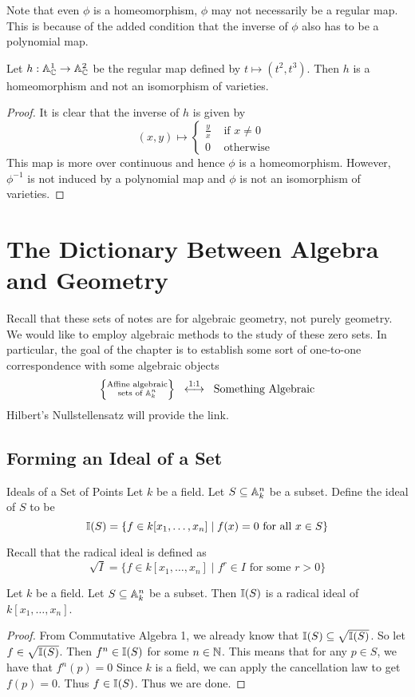 \documentclass[a4paper]{article}
\begin{document}
Note that even $\phi$ is a homeomorphism, $\phi$ may not necessarily be a regular map. This is because of the added condition that the inverse of $\phi$ also has to be a polynomial map. 

\begin{eg}{}{} Let $h:\mathbb{A}_{\mathbb{C}}^1\to\mathbb{A}_{\mathbb{C}}^2$ be the regular map defined by $t\mapsto(t^2,t^3)$. Then $h$ is a homeomorphism and not an isomorphism of varieties. \tcbline
\begin{proof}
It is clear that the inverse of $h$ is given by $$(x,y)\mapsto\begin{cases}
\frac{y}{x} & \text{ if }x\neq 0\\
0 & \text{ otherwise }
\end{cases}$$ This map is more over continuous and hence $\phi$ is a homeomorphism. However, $\phi^{-1}$ is not induced by a polynomial map and $\phi$ is not an isomorphism of varieties. 
\end{proof}
\end{eg}

\pagebreak
\section{The Dictionary Between Algebra and Geometry}
Recall that these sets of notes are for algebraic geometry, not purely geometry. We would like to employ algebraic methods to the study of these zero sets. In particular, the goal of the chapter is to establish some sort of one-to-one correspondence with some algebraic objects $$\left\{\substack{\text{Affine algebraic}\\\text{sets of }\mathbb{A}_k^n}\right\}\;\;\overset{1:1}{\longleftrightarrow}\;\;\text{Something Algebraic}$$ Hilbert's Nullstellensatz will provide the link. 

\subsection{Forming an Ideal of a Set}
\begin{defn}{Ideals of a Set of Points}{} Let $k$ be a field. Let $S\subseteq\mathbb{A}_k^n$ be a subset. Define the ideal of $S$ to be $$\mathbb{I}(S)=\{f\in k[x_1,\dots,x_n]\;|\;f(x)=0\text{ for all }x\in S\}$$ 
\end{defn}

Recall that the radical ideal is defined as $$\sqrt{I}=\{f\in k[x_1,\dots,x_n]\;|\;f^r\in I\text{ for some }r>0\}$$

\begin{lmm}{}{} Let $k$ be a field. Let $S\subseteq\mathbb{A}_k^n$ be a subset. Then $\mathbb{I}(S)$ is a radical ideal of $k[x_1,\dots,x_n]$. \tcbline
\begin{proof}
From Commutative Algebra 1, we already know that $\mathbb{I}(S)\subseteq\sqrt{\mathbb{I}(S)}$. So let $f\in\sqrt{\mathbb{I}(S)}$. Then $f^n\in\mathbb{I}(S)$ for some $n\in\mathbb{N}$. This means that for any $p\in S$, we have that $f^n(p)=0$ Since $k$ is a field, we can apply the cancellation law to get $f(p)=0$. Thus $f\in\mathbb{I}(S)$. Thus we are done. 
\end{proof}
\end{lmm}
\end{document}
